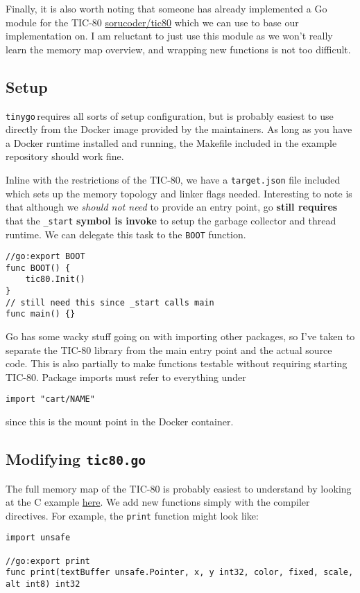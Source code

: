 \documentclass{article}
\newcommand{\tinygo}{\texttt{tinygo}\,}
\begin{document}
Finally, it is also worth noting that someone has already implemented a Go module for the TIC-80 \href{https://github.com/sorucoder/tic80/blob/master/tic80.go}{sorucoder/tic80} which we can use to base our implementation on. I am reluctant to just use this module as we won't really learn the memory map overview, and wrapping new functions is not too difficult.


\subsection{Setup}

\tinygo requires all sorts of setup configuration, but is probably easiest to use directly from the Docker image provided by the maintainers. As long as you have a Docker runtime installed and running, the Makefile included in the example repository should work fine.

Inline with the restrictions of the TIC-80, we have a \lstinline|target.json| file included which sets up the memory topology and linker flags needed. Interesting to note is that although we \textit{should not need} to provide an entry point, go \textbf{still requires} that the \lstinline|_start| \textbf{symbol is invoke} to setup the garbage collector and thread runtime. We can delegate this task to the \lstinline|BOOT| function.
\\
\begin{lstlisting}
//go:export BOOT
func BOOT() {
    tic80.Init()
}
// still need this since _start calls main
func main() {}
\end{lstlisting}

\noindent Go has some wacky stuff going on with importing other packages, so I've taken to separate the TIC-80 library from the main entry point and the actual source code. This is also partially to make functions testable without requiring starting TIC-80. Package imports must refer to everything under
\\

\begin{lstlisting}
import "cart/NAME"
\end{lstlisting}

\noindent since this is the mount point in the Docker container. 

\subsection{Modifying \texttt{tic80.go}}

The full memory map of the TIC-80 is probably easiest to understand by looking at the C example \href{https://github.com/nesbox/TIC-80/blob/main/templates/c/src/tic80.h}{here}. We add new functions simply with the compiler directives. For example, the \lstinline|print| function might look like:
\\
\begin{lstlisting}
import unsafe

//go:export print
func print(textBuffer unsafe.Pointer, x, y int32, color, fixed, scale, alt int8) int32
\end{lstlisting}
\end{document}
